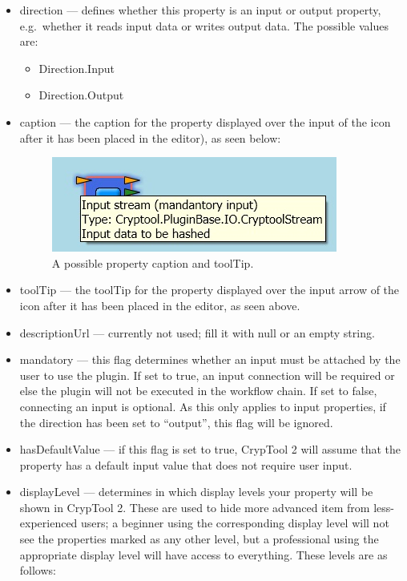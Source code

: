 \begin{itemize}
	\item direction --- defines whether this property is an input or output property, e.g.\ whether it reads input data or writes output data. The possible values are:
	\begin{itemize}
		\item Direction.Input
		\item Direction.Output
	\end{itemize}
	\item caption --- the caption for the property displayed over the input of the icon after it has been placed in the editor), as seen below:
	
\begin{figure}[h]
	\centering
		\includegraphics[width=.55\textwidth]{figures/property_caption.jpg}
	\caption{A possible property caption and toolTip.}
	\label{fig:property_caption}
\end{figure}

	\item toolTip --- the toolTip for the property displayed over the input arrow of the icon after it has been placed in the editor, as seen above.
	\item descriptionUrl --- currently not used; fill it with null or an empty string.
	\item mandatory --- this flag determines whether an input must be attached by the user to use the plugin. If set to true, an input connection will be required or else the plugin will not be executed in the workflow chain. If set to false, connecting an input is optional. As this only applies to input properties, if the direction has been set to ``output'', this flag will be ignored.
	\item hasDefaultValue --- if this flag is set to true, CrypTool 2 will assume that the property has a default input value that does not require user input.
	\item displayLevel --- determines in which display levels your property will be shown in CrypTool 2. These are used to hide more advanced item from less-experienced users; a beginner using the corresponding display level will not see the properties marked as any other level, but a professional using the appropriate display level will have access to everything. These levels are as follows:
	

\end{itemize}
